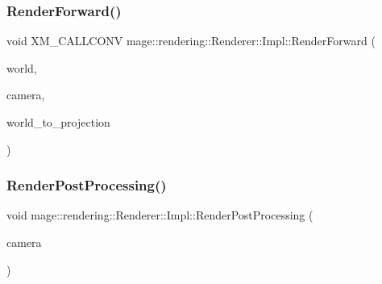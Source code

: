 \hypertarget{classmage_1_1rendering_1_1_renderer_1_1_impl_a42d47faf6879db3bc00190b9e626eef9}{}\label{classmage_1_1rendering_1_1_renderer_1_1_impl_a42d47faf6879db3bc00190b9e626eef9} 
\subsubsection{\texorpdfstring{Render\+Forward()}{RenderForward()}}
{\footnotesize\ttfamily void X\+M\+\_\+\+C\+A\+L\+L\+C\+O\+NV mage\+::rendering\+::\+Renderer\+::\+Impl\+::\+Render\+Forward (\begin{DoxyParamCaption}\item[{const \hyperlink{classmage_1_1rendering_1_1_world}{World} \&}]{world,  }\item[{const \hyperlink{classmage_1_1rendering_1_1_camera}{Camera} \&}]{camera,  }\item[{F\+X\+M\+M\+A\+T\+R\+IX}]{world\+\_\+to\+\_\+projection }\end{DoxyParamCaption})\hspace{0.3cm}{\ttfamily [private]}}

\hypertarget{classmage_1_1rendering_1_1_renderer_1_1_impl_ae4d71c1e7ec4412983d1728337767b3c}{}\label{classmage_1_1rendering_1_1_renderer_1_1_impl_ae4d71c1e7ec4412983d1728337767b3c} 
\subsubsection{\texorpdfstring{Render\+Post\+Processing()}{RenderPostProcessing()}}
{\footnotesize\ttfamily void mage\+::rendering\+::\+Renderer\+::\+Impl\+::\+Render\+Post\+Processing (\begin{DoxyParamCaption}\item[{const \hyperlink{classmage_1_1rendering_1_1_camera}{Camera} \&}]{camera }\end{DoxyParamCaption})\hspace{0.3cm}{\ttfamily [private]}}

\hypertarget{classmage_1_1rendering_1_1_renderer_1_1_impl_a39a9a77669ce1c2615f61806dd4f06e3}{}\label{classmage_1_1rendering_1_1_renderer_1_1_impl_a39a9a77669ce1c2615f61806dd4f06e3} 
